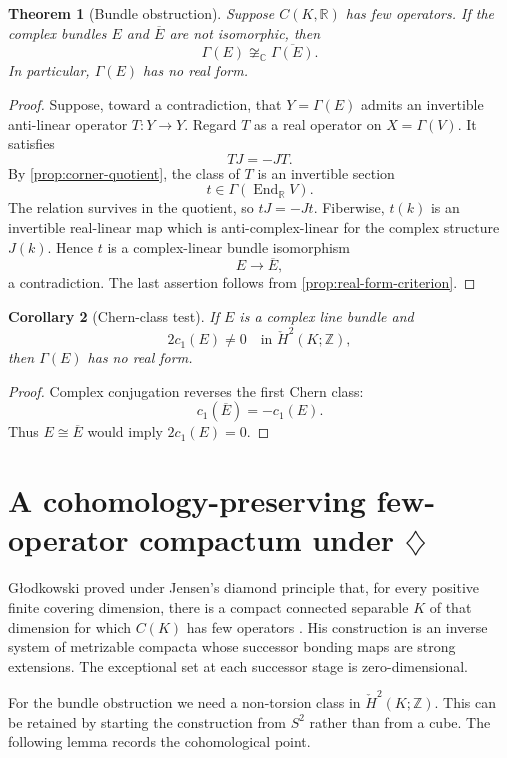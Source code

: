 \documentclass[11pt]{article}
\newtheorem{theorem}{Theorem}[section]
\newtheorem{corollary}[theorem]{Corollary}
\theoremstyle{definition}
\theoremstyle{remark}
\newcommand{\C}{\mathbb C}
\newcommand{\R}{\mathbb R}
\newcommand{\Z}{\mathbb Z}
\newcommand{\End}{\operatorname{End}}
\newcommand{\Hcheck}{\check H}
\begin{document}
\begin{theorem}[Bundle obstruction]\label{thm:bundle-obstruction}
Suppose $C(K,\R)$ has few operators. If the complex bundles $E$ and $\overline E$ are not isomorphic, then
\[
        \Gamma(E)\not\cong_{\C}\overline{\Gamma(E)}.
\]
In particular, $\Gamma(E)$ has no real form.
\end{theorem}

\begin{proof}
Suppose, toward a contradiction, that $Y=\Gamma(E)$ admits an invertible anti-linear operator $T:Y\to Y$. Regard $T$ as a real operator on $X=\Gamma(V)$. It satisfies
\[
       TJ=-JT.
\]
By \cref{prop:corner-quotient}, the class of $T$ is an invertible section
\[
       t\in\Gamma(\End_{\R}V).
\]
The relation survives in the quotient, so $tJ=-Jt$. Fiberwise, $t(k)$ is an invertible real-linear map which is anti-complex-linear for the complex structure $J(k)$. Hence $t$ is a complex-linear bundle isomorphism
\[
       E\longrightarrow\overline E,
\]
a contradiction. The last assertion follows from \cref{prop:real-form-criterion}.
\end{proof}

\begin{corollary}[Chern-class test]\label{cor:chern-test}
If $E$ is a complex line bundle and
\[
       2c_1(E)\ne0\quad\text{in }\Hcheck^2(K;\Z),
\]
then $\Gamma(E)$ has no real form.
\end{corollary}

\begin{proof}
Complex conjugation reverses the first Chern class:
\[
       c_1(\overline E)=-c_1(E).
\]
Thus $E\cong\overline E$ would imply $2c_1(E)=0$.
\end{proof}

\section[A cohomology-preserving few-operator compactum under diamond]{A cohomology-preserving few-operator compactum under $\diamondsuit$}

G\l odkowski proved under Jensen's diamond principle that, for every positive finite covering dimension, there is a compact connected separable $K$ of that dimension for which $C(K)$ has few operators \cite{Glodkowski}. His construction is an inverse system of metrizable compacta whose successor bonding maps are strong extensions. The exceptional set at each successor stage is zero-dimensional.

For the bundle obstruction we need a non-torsion class in $\Hcheck^2(K;\Z)$. This can be retained by starting the construction from $S^2$ rather than from a cube. The following lemma records the cohomological point.
\end{document}
